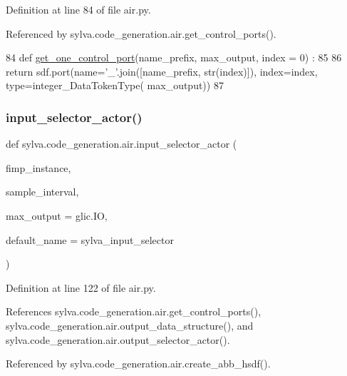 Definition at line 84 of file air.\+py.



Referenced by sylva.\+code\+\_\+generation.\+air.\+get\+\_\+control\+\_\+ports().


\begin{DoxyCode}
84 \textcolor{keyword}{def }\hyperlink{namespacesylva_1_1code__generation_1_1air_aab89db05c96a30b48a7afc9c857af6d7}{get\_one\_control\_port}(name\_prefix, max\_output, index = 0) :
85 
86   \textcolor{keywordflow}{return} sdf.port(name=\textcolor{stringliteral}{'\_'}.join([name\_prefix, str(index)]), index=index, type=integer\_DataTokenType(
      max\_output))
87 
\end{DoxyCode}
\mbox{\label{namespacesylva_1_1code__generation_1_1air_aaa165d9fb26a2af721734a446b1549fa}} 
\subsubsection{\texorpdfstring{input\+\_\+selector\+\_\+actor()}{input\_selector\_actor()}}
{\footnotesize\ttfamily def sylva.\+code\+\_\+generation.\+air.\+input\+\_\+selector\+\_\+actor (\begin{DoxyParamCaption}\item[{}]{fimp\+\_\+instance,  }\item[{}]{sample\+\_\+interval,  }\item[{}]{max\+\_\+output = {\ttfamily glic.IO},  }\item[{}]{default\+\_\+name = {\ttfamily \textquotesingle{}sylva\+\_\+input\+\_\+selector\textquotesingle{}} }\end{DoxyParamCaption})}



Definition at line 122 of file air.\+py.



References sylva.\+code\+\_\+generation.\+air.\+get\+\_\+control\+\_\+ports(), sylva.\+code\+\_\+generation.\+air.\+output\+\_\+data\+\_\+structure(), and sylva.\+code\+\_\+generation.\+air.\+output\+\_\+selector\+\_\+actor().



Referenced by sylva.\+code\+\_\+generation.\+air.\+create\+\_\+abb\+\_\+hsdf().


